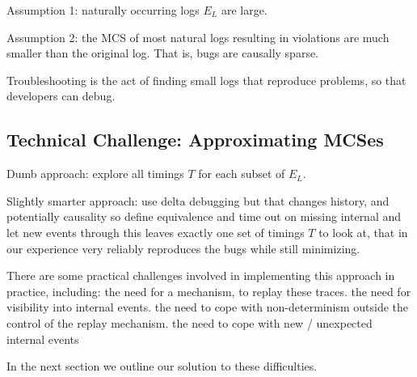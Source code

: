 Assumption 1: naturally occurring  logs $E_L$ are large.

Assumption 2: the MCS of most natural logs resulting in violations are much smaller than the original log.  That is, bugs are causally sparse.

Troubleshooting is the act of finding small logs that reproduce problems, so that developers can debug.

\subsection{Technical Challenge: Approximating MCSes}

\begin{outline}
\1 Dumb approach: explore all timings $T$ for each subset of $E_L$.

\1 Slightly smarter approach:
  \2 use delta debugging
  \2 but that changes history, and potentially causality
  \2 so define equivalence
  \2 and time out on missing internal
  \2 and let new events through
  \2 this leaves exactly one set of timings $T$ to look at, that in our
  experience very reliably reproduces the bugs while still minimizing.

\1 There are some practical challenges involved in implementing this approach in
practice, including:
   \2 the need for a mechanism, to replay these traces.
   \2 the need for visibility into internal events.
   \2 the need to cope with non-determinism outside the control of the
   replay mechanism.
   \2 the need to cope with new / unexpected internal events

\1 In the next section we outline our solution to these difficulties.
\end{outline}
